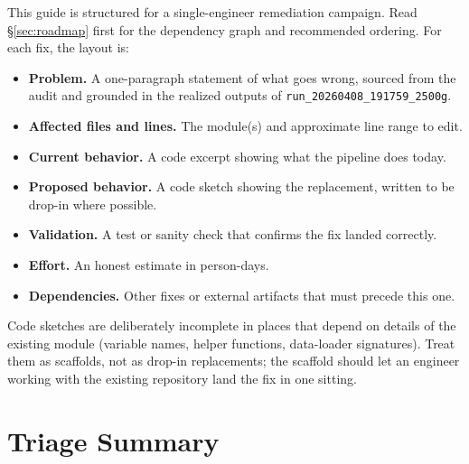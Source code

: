 \documentclass[11pt]{article}
\newcommand{\code}[1]{\texttt{#1}}
\begin{document}
This guide is structured for a single-engineer remediation campaign. Read \S\ref{sec:roadmap} first for the dependency graph and recommended ordering. For each fix, the layout is:

\begin{itemize}[leftmargin=*]
\item \textbf{Problem.} A one-paragraph statement of what goes wrong, sourced from the audit and grounded in the realized outputs of \code{run\_20260408\_191759\_2500g}.
\item \textbf{Affected files and lines.} The module(s) and approximate line range to edit.
\item \textbf{Current behavior.} A code excerpt showing what the pipeline does today.
\item \textbf{Proposed behavior.} A code sketch showing the replacement, written to be drop-in where possible.
\item \textbf{Validation.} A test or sanity check that confirms the fix landed correctly.
\item \textbf{Effort.} An honest estimate in person-days.
\item \textbf{Dependencies.} Other fixes or external artifacts that must precede this one.
\end{itemize}

Code sketches are deliberately incomplete in places that depend on details of the existing module (variable names, helper functions, data-loader signatures). Treat them as scaffolds, not as drop-in replacements; the scaffold should let an engineer working with the existing repository land the fix in one sitting.

\section{Triage Summary}
\end{document}
